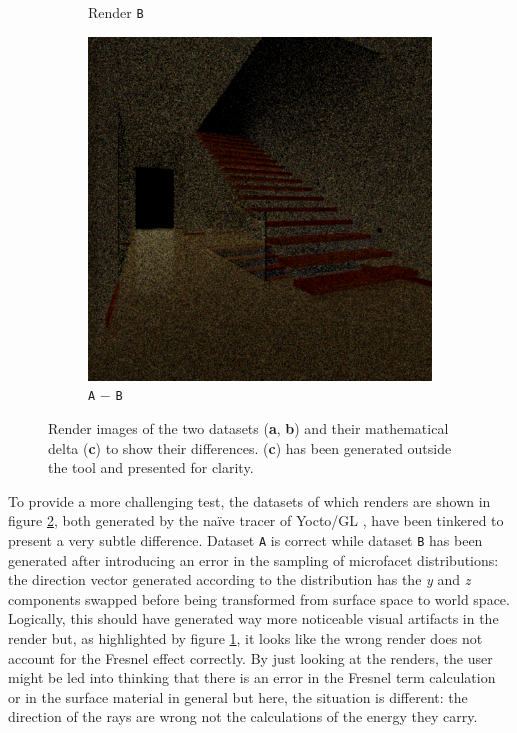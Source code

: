\begin{figure}
\begin{subfigure}[t]{0.32\linewidth}
		\caption{Render \texttt{B}}
	\end{subfigure}
	\begin{subfigure}[t]{0.32\linewidth}
		\includegraphics[width=\textwidth]{chapters/chapter_results/render2difference}
		\caption{\texttt{A} $-$ \texttt{B}}
		\label{render2difference}
	\end{subfigure}

	\caption{Render images of the two datasets (\textbf{a}, \textbf{b}) and their mathematical delta (\textbf{c}) to show their differences. (\textbf{c}) has been generated outside the tool and presented for clarity.}
	\label{couple2render}
\end{figure}

To provide a more challenging test, the datasets of which renders are shown in figure \ref{couple2render}, both generated by the na\"ive tracer of Yocto/GL \cite{pellacini2019yocto}, have been tinkered to present a very subtle difference. Dataset \texttt{A} is correct while dataset \texttt{B} has been generated after introducing an error in the sampling of microfacet distributions: the direction vector generated according to the distribution has the \textit{y} and \textit{z} components swapped before being transformed from surface space to world space. Logically, this should have generated way more noticeable visual artifacts in the render but, as highlighted by figure \ref{render2difference}, it looks like the wrong render does not account for the Fresnel effect correctly. By just looking at the renders, the user might be led into thinking that there is an error in the Fresnel term calculation or in the surface material in general but here, the situation is different: the direction of the rays are wrong not the calculations of the energy they carry.


